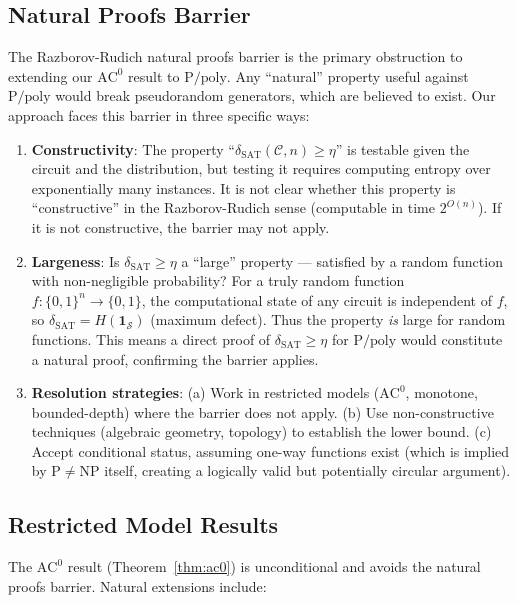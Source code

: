 \documentclass[11pt]{article}
\theoremstyle{definition}
\theoremstyle{remark}
\newcommand{\calC}{\mathcal{C}}
\newcommand{\calS}{\mathcal{S}}
\newcommand{\Ppoly}{\mathrm{P/poly}}
\newcommand{\ACz}{\mathrm{AC}^0}
\newcommand{\dSAT}{\delta_{\mathrm{SAT}}}
\begin{document}
\subsection{Natural Proofs Barrier}

The Razborov-Rudich natural proofs barrier \cite{RR} is the primary
obstruction to extending our $\ACz$ result to $\Ppoly$.  Any
``natural'' property useful against $\Ppoly$ would break pseudorandom
generators, which are believed to exist.  Our approach faces this barrier
in three specific ways:

\begin{enumerate}
  \item \textbf{Constructivity}: The property ``$\dSAT(\calC, n) \geq \eta$''
    is testable given the circuit and the distribution, but testing it requires
    computing entropy over exponentially many instances.  It is not clear
    whether this property is ``constructive'' in the Razborov-Rudich sense
    (computable in time $2^{O(n)}$).  If it is not constructive, the barrier
    may not apply.

  \item \textbf{Largeness}: Is $\dSAT \geq \eta$ a ``large'' property ---
    satisfied by a random function with non-negligible probability?  For a
    truly random function $f: \{0,1\}^n \to \{0,1\}$, the computational state
    of any circuit is independent of $f$, so $\dSAT = H(\mathbf{1}_{\calS})$
    (maximum defect).  Thus the property \emph{is} large for random functions.
    This means a direct proof of $\dSAT \geq \eta$ for $\Ppoly$ would
    constitute a natural proof, confirming the barrier applies.

  \item \textbf{Resolution strategies}: (a) Work in restricted models
    ($\ACz$, monotone, bounded-depth) where the barrier does not apply.
    (b) Use non-constructive techniques (algebraic geometry, topology) to
    establish the lower bound. (c) Accept conditional status, assuming
    one-way functions exist (which is implied by $\mathrm{P} \neq \mathrm{NP}$
    itself, creating a logically valid but potentially circular argument).
\end{enumerate}

\subsection{Restricted Model Results}

The $\ACz$ result (Theorem~\ref{thm:ac0}) is unconditional and avoids
the natural proofs barrier.  Natural extensions include:
\end{document}
